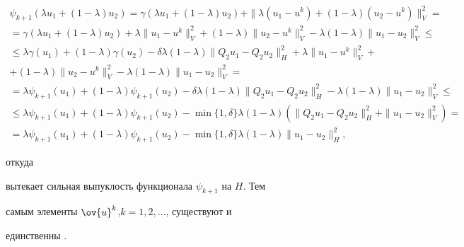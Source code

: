 \begin{gather*}


\psi_{k+1}(\lambda u_1+(1-\lambda)u_2)=


\gamma(\lambda


u_1+(1-\lambda)u_2)+\|\lambda(u_1-u^k)+(1-\lambda)(u_2-u^k)\|^2_V=\\


%


=\gamma(\lambda u_1+(1-\lambda)u_2)+


\lambda\|u_1-u^k\|^2_V+(1-\lambda)\|u_2-u^k\|^2_V-


\lambda(1-\lambda)\|u_1-u_2\|^2_V\le \\


%


\le \lambda\gamma(u_1)+(1-\lambda)\gamma(u_2)-


\delta\lambda(1-\lambda)\|Q_2u_1-Q_2u_2\|^2_H+


\lambda\|u_1-u^k\|^2_V+\\


%


+(1-\lambda)\|u_2-u^k\|^2_V-


\lambda(1-\lambda)\|u_1-u_2\|^2_V=\\


%


=\lambda\psi_{k+1}(u_1)+(1-\lambda)\psi_{k+1}(u_2)-\delta\lambda(1-\lambda)


\|Q_2u_1-Q_2u_2\|^2_H-\lambda(1-\lambda)\|u_1-u_2\|^2_V\le \\


%


\le \lambda\psi_{k+1}(u_1)+(1-\lambda)\psi_{k+1}(u_2)


-\min\{1,\delta\}\lambda(1-\lambda)(\|Q_2u_1-Q_2u_2\|^2_H+\|u_1-u_2\|^2_V)=\\


%


=\lambda\psi_{k+1}(u_1)+(1-\lambda)\psi_{k+1}(u_2)


-\min\{1,\delta\}\lambda(1-\lambda)\|u_1-u_2\|^2_H,


\end{gather*}


откуда 


вытекает сильная выпуклость функционала $\psi_{k+1}$ на $H$. Тем


самым элементы  $\ov{u}^{k}$,\linebreak $k=1, 2, \dotsc$, существуют и


единственны \cite{1}.





